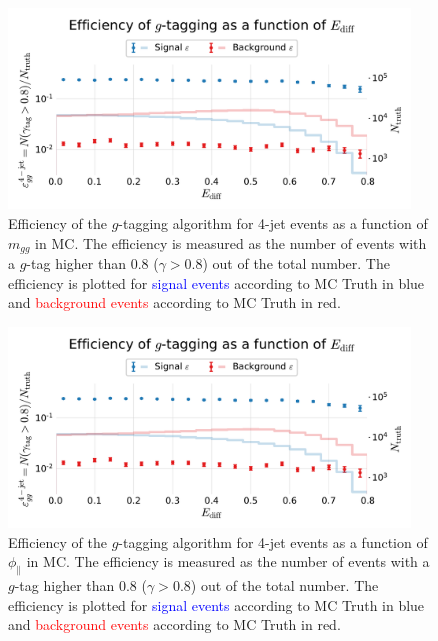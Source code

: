 \begin{figure}
  \centerfloat
  \includegraphics[width=0.95\textwidth, trim=10 10 10 45, clip, page=5]{figures/quarks/efficiency_events-down_sample=1.00-ML_vars=vertex-selection=b-ejet_min=4-n_iter_RS_lgb=99-n_iter_RS_xgb=9-cdot_cut=0.90-version=19-njet=4.pdf}
  \caption[$g$-Tagging Efficiency for 4-Jet Events in MC as a Function of $m_{gg}$]
          {Efficiency of the $g$-tagging algorithm for 4-jet events as a function of $m_{gg}$  in MC. The efficiency is measured as the number of events with a $g$-tag higher than 0.8 ($\gamma > 0.8$) out of the total number. The efficiency is plotted for \textcolor{blue}{signal events} according to MC Truth in blue and \textcolor{red}{background events} according to MC Truth in red.
          } 
  \label{fig:q:effiency_gtag_m_gg}
\end{figure}
\begin{figure}
  \centerfloat
  \includegraphics[width=0.95\textwidth, trim=10 10 10 45, clip, page=6]{figures/quarks/efficiency_events-down_sample=1.00-ML_vars=vertex-selection=b-ejet_min=4-n_iter_RS_lgb=99-n_iter_RS_xgb=9-cdot_cut=0.90-version=19-njet=4.pdf}
  \caption[$g$-Tagging Efficiency for 4-Jet Events in MC as a Function of $\phi_\mathrm{\parallel}$]
          {Efficiency of the $g$-tagging algorithm for 4-jet events as a function of $\phi_\mathrm{\parallel}$  in MC. The efficiency is measured as the number of events with a $g$-tag higher than 0.8 ($\gamma > 0.8$) out of the total number. The efficiency is plotted for \textcolor{blue}{signal events} according to MC Truth in blue and \textcolor{red}{background events} according to MC Truth in red.
          } 
  \label{fig:q:effiency_gtag_phi_planes}
\end{figure}
